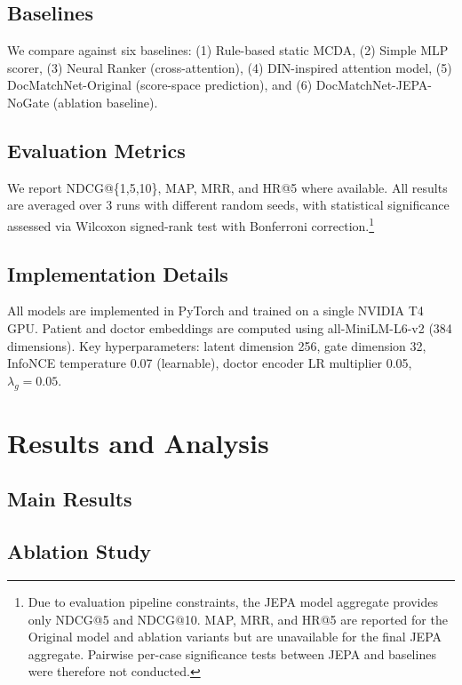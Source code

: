 \documentclass[journal]{IEEEtran}
\begin{document}
\subsection{Baselines}

We compare against six baselines: (1) Rule-based static MCDA,
(2) Simple MLP scorer, (3) Neural Ranker (cross-attention),
(4) DIN-inspired attention model, (5) DocMatchNet-Original
(score-space prediction), and (6) DocMatchNet-JEPA-NoGate
(ablation baseline).

\subsection{Evaluation Metrics}

We report NDCG@\{1,5,10\}, MAP, MRR, and HR@5 where available.
All results are averaged over 3 runs with different random seeds,
with statistical significance assessed via Wilcoxon signed-rank
test with Bonferroni correction.\footnote{Due to evaluation
pipeline constraints, the JEPA model aggregate provides only
NDCG@5 and NDCG@10. MAP, MRR, and HR@5 are reported for the
Original model and ablation variants but are unavailable for
the final JEPA aggregate. Pairwise per-case significance tests
between JEPA and baselines were therefore not conducted.}

\subsection{Implementation Details}

All models are implemented in PyTorch and trained on a single
NVIDIA T4 GPU. Patient and doctor embeddings are computed
using all-MiniLM-L6-v2 (384 dimensions). Key hyperparameters:
latent dimension 256, gate dimension 32, InfoNCE temperature
0.07 (learnable), doctor encoder LR multiplier 0.05,
$\lambda_g = 0.05$.

\section{Results and Analysis}

\subsection{Main Results}


\subsection{Ablation Study}

\end{document}
